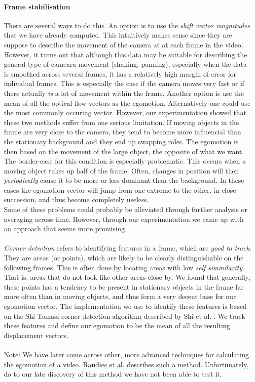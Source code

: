 \paragraph{Frame stabilisation}
%
There are several ways to do this. An option is to use the \textit{shift vector magnitudes} that we have already computed. This intuitively makes sense since they are suppose to describe the movement of the camera at at each frame in the video. However, it turns out that although this data may be suitable for describing the general type of cameara movement (shaking, panning), especially when the data is smoothed across several frames, it has a relatively high margin of error for individual frames. This is especially the case if the camera moves very fast or if there actually \textit{is} a lot of movement within the frame. Another option is use the mean of all the optical flow vectors as the egomotion. Alternatively one could use the most commonly occuring vector. However, our experimentation showed that these two methods suffer from one serious limitation. If moving objects in the frame are very close to the camera, they tend to become more influencial than the stationary background and they end up swapping roles. The egomotion is then based on the movement of the large object, the opposite of what we want. The border-case for this condition is especially problematic. This occurs when a moving object takes up half of the frame. Often, changes in position will then \textit{periodically} cause it to be more or less dominant than the background. In these cases the egomotion vector will jump from one extreme to the other, in close succession, and thus become completely useless.\\
Some of these problems could probably be alleviated through further analysis or averaging across time. However, through our experimentation we came up with an approach that seems more promising.\\
\\
\textit{Corner detection} refers to identifying features in a frame, which are \textit{good to track}. They are areas (or points), which are likely to be clearly distinguishable on the following frames. This is often done by locating areas with low \textit{self simmilarity}. That is, areas that do not look like other areas close by. We found that generally, these points has a tendency to be present in stationary objects in the frame far more often than in moving objects, and thus form a very decent base for our egomotion vector. The implementation we use to identify these features is based on the Shi-Tomasi corner detection algorithm described by Shi et al. \cite{Shi_1994_3266}. We track these features and define our egomotion to be the mean of all the resulting displacement vectors.\\
\\
Note: We have later come across other, more advanced techniques for calculating the egomotion of a video. Raudies et al. \cite{Raudies:2009:ELM:1612122.1612125} describes such a method. Unfortunately, do to our late discovery of this method we have not been able to test it.
%
